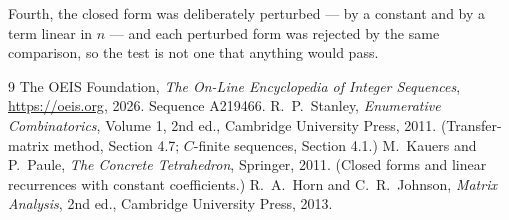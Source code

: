 \documentclass[11pt,a4paper]{article}
\theoremstyle{plain}
\theoremstyle{definition}
\begin{document}
Fourth, the closed form was deliberately perturbed --- by a constant and by a term linear in
$n$ --- and each perturbed form was rejected by the same comparison, so the test is not one
that anything would pass.

\begin{thebibliography}{9}
 The OEIS Foundation, \emph{The On-Line Encyclopedia of Integer
Sequences}, \url{https://oeis.org}, 2026. Sequence A219466.
 R.~P.~Stanley, \emph{Enumerative Combinatorics}, Volume 1, 2nd ed.,
Cambridge University Press, 2011. (Transfer-matrix method, Section 4.7; $C$-finite sequences,
Section 4.1.)
 M.~Kauers and P.~Paule, \emph{The Concrete Tetrahedron}, Springer, 2011.
(Closed forms and linear recurrences with constant coefficients.)
 R.~A.~Horn and C.~R.~Johnson, \emph{Matrix Analysis}, 2nd ed., Cambridge
University Press, 2013.
\end{thebibliography}
\end{document}
